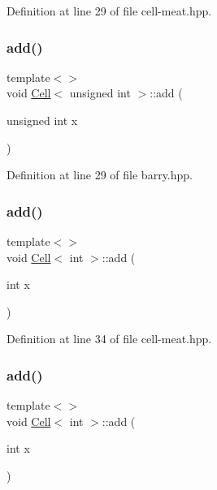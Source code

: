 Definition at line 29 of file cell-\/meat.\+hpp.

\mbox{\label{class_cell_ae22060201cf692bbf219827453d0acd2}} 
\subsubsection{\texorpdfstring{add()}{add()}\hspace{0.1cm}{\footnotesize\ttfamily [4/9]}}
{\footnotesize\ttfamily template$<$$>$ \\
void \hyperlink{class_cell}{Cell}$<$ unsigned int $>$\+::add (\begin{DoxyParamCaption}\item[{unsigned int}]{x }\end{DoxyParamCaption})\hspace{0.3cm}{\ttfamily [inline]}}



Definition at line 29 of file barry.\+hpp.

\mbox{\label{class_cell_a74cb069c7341de33354c396465818c2f}} 
\subsubsection{\texorpdfstring{add()}{add()}\hspace{0.1cm}{\footnotesize\ttfamily [5/9]}}
{\footnotesize\ttfamily template$<$$>$ \\
void \hyperlink{class_cell}{Cell}$<$ int $>$\+::add (\begin{DoxyParamCaption}\item[{int}]{x }\end{DoxyParamCaption})\hspace{0.3cm}{\ttfamily [inline]}}



Definition at line 34 of file cell-\/meat.\+hpp.

\mbox{\label{class_cell_a74cb069c7341de33354c396465818c2f}} 
\subsubsection{\texorpdfstring{add()}{add()}\hspace{0.1cm}{\footnotesize\ttfamily [6/9]}}
{\footnotesize\ttfamily template$<$$>$ \\
void \hyperlink{class_cell}{Cell}$<$ int $>$\+::add (\begin{DoxyParamCaption}\item[{int}]{x }\end{DoxyParamCaption})\hspace{0.3cm}{\ttfamily [inline]}}



